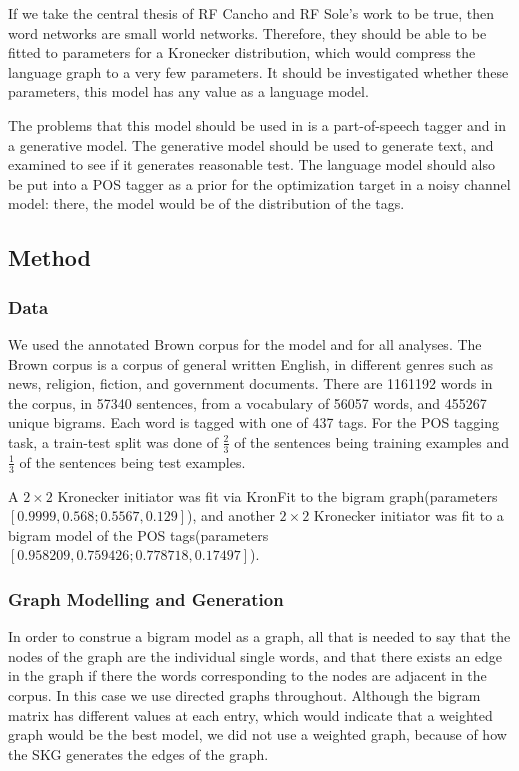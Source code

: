 \documentclass[12pt]{article}
\begin{document}
If we take the central thesis of RF Cancho and RF Sole's work to be true, then word networks are small world networks. Therefore, they should be able to be fitted to parameters for a Kronecker distribution, which would compress the language graph to a very few parameters. It should be investigated whether these parameters, this model has any value as a language model.

The problems that this model should be used in is a part-of-speech tagger and in a generative model. The generative model should be used to generate text, and examined to see if it generates reasonable test. The language model should also be put into a POS tagger as a prior for the optimization target in a noisy channel model: there, the model would be of the distribution of the tags. \cite{collins}

\subsection*{Method}

\subsubsection*{Data}
We used the annotated Brown corpus for the model and for all analyses. The Brown corpus is a corpus of general written English, in different genres such as news, religion, fiction, and government documents. There are 1161192 words in the corpus, in 57340 sentences, from a vocabulary of 56057 words, and 455267 unique bigrams. Each word is tagged with one of 437 tags. For the POS tagging task, a train-test split was done of $\frac{2}{3}$ of the sentences being training examples and $\frac{1}{3}$ of the sentences being test examples. %

A $2 \times 2$ Kronecker initiator was fit via KronFit to the bigram graph(parameters $[ 0.9999, 0.568; 0.5567, 0.129 ]$), and another $2 \times 2$ Kronecker initiator was fit to a bigram model of the POS tags(parameters $[0.958209, 0.759426; 0.778718, 0.17497]$).

\subsubsection*{Graph Modelling and Generation}
In order to construe a bigram model as a graph, all that is needed to say that the nodes of the graph are the individual single words, and that there exists an edge in the graph if there the words corresponding to the nodes are adjacent in the corpus. In this case we use directed graphs throughout. Although the bigram matrix has different values at each entry, which would indicate that a weighted graph would be the best model, we did not use a weighted graph, because of how the SKG generates the edges of the graph.
\end{document}
